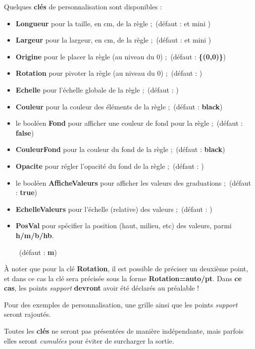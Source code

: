\documentclass[french,a4paper,11pt]{article}
\newcommand\Cle[1]{{\bfseries\sffamily\textlangle #1\textrangle}}
\begin{document}
\begin{tipblock}
Quelques \Cle{clés} de personnalisation sont disponibles :

\begin{itemize}
	\item \Cle{Longueur} pour la taille, en cm, de la règle ;\hfill~(défaut : \Cle{12} et mini \Cle{3})
	\item \Cle{Largeur} pour la largeur, en cm, de la règle ;\hfill~(défaut : \Cle{1.5} et mini \Cle{1.25})
	\item \Cle{Origine} pour le placer la règle (au niveau du $0$) ;\hfill~(défaut : \Cle{\{(0,0)\}})
	\item \Cle{Rotation} pour pivoter la règle (au niveau du $0$) ;\hfill~(défaut : \Cle{0})
	\item \Cle{Echelle} pour l'échelle globale de la règle ;\hfill~(défaut : \Cle{1})
	\item \Cle{Couleur} pour la couleur des éléments de la règle ;\hfill~(défaut : \Cle{black})
	\item le booléen \Cle{Fond} pour afficher une couleur de fond pour la règle ;\hfill~(défaut : \Cle{false})
	\item \Cle{CouleurFond} pour la couleur du fond de la règle ;\hfill~(défaut : \Cle{black})
	\item \Cle{Opacite} pour régler l'opacité du fond de la règle ;\hfill~(défaut : \Cle{0.5})
	\item le booléen \Cle{AfficheValeurs} pour afficher les valeurs des graduations ;\hfill~(défaut : \Cle{true})
	\item \Cle{EchelleValeurs} pour l'échelle (relative) des valeurs ;\hfill~(défaut : \Cle{0.8})
	\item \Cle{PosVal} pour spécifier la position (haut, milieu, etc) des valeurs, parmi \Cle{h/m/b/hb}.
	
	\hfill~(défaut : \Cle{m})
\end{itemize}

À noter que pour la clé \Cle{Rotation}, il est possible de préciser un deuxième point, et dans ce cas la clé sera précisée sous la forme \Cle{Rotation=auto/pt}. Dans \textbf{ce cas}, les points \textit{support} \textbf{devront} avoir été déclarés au préalable !
\end{tipblock}

\begin{noteblock}
Pour des exemples de personnalisation, une grille ainsi que les points \textit{support} seront rajoutés.

\smallskip

Toutes les \Cle{clés} ne seront pas présentées de manière indépendante, mais parfois elles seront \textit{cumulées} pour éviter de surcharger la sortie.
\end{noteblock}
\end{document}
